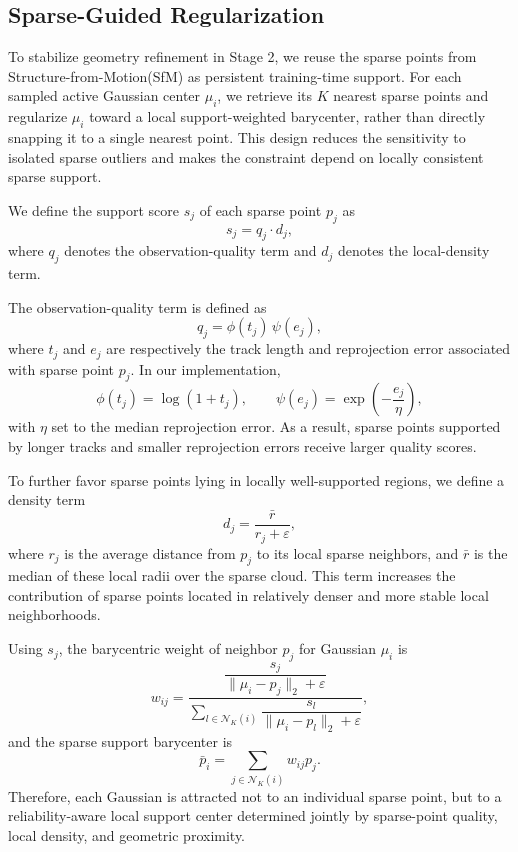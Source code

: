 \subsection{Sparse-Guided Regularization}
To stabilize geometry refinement in Stage 2, we reuse the sparse points from Structure-from-Motion(SfM) as persistent training-time support. For each sampled active Gaussian center $\mu_i$, we retrieve its $K$ nearest sparse points and regularize $\mu_i$ toward a local support-weighted barycenter, rather than directly snapping it to a single nearest point. This design reduces the sensitivity to isolated sparse outliers and makes the constraint depend on locally consistent sparse support.

We define the support score $s_j$ of each sparse point $p_j$ as
\begin{equation}
s_j = q_j \cdot d_j,
\end{equation}
where $q_j$ denotes the observation-quality term and $d_j$ denotes the local-density term.

The observation-quality term is defined as
\begin{equation}
q_j = \phi(t_j)\,\psi(e_j),
\end{equation}
where $t_j$ and $e_j$ are respectively the track length and reprojection error associated with sparse point $p_j$. In our implementation,
\begin{equation}
\phi(t_j)=\log(1+t_j), \qquad
\psi(e_j)=\exp\!\left(-\frac{e_j}{\eta}\right),
\end{equation}
with $\eta$ set to the median reprojection error. As a result, sparse points supported by longer tracks and smaller reprojection errors receive larger quality scores.

To further favor sparse points lying in locally well-supported regions, we define a density term
\begin{equation}
d_j = \frac{\bar{r}}{r_j+\varepsilon},
\end{equation}
where $r_j$ is the average distance from $p_j$ to its local sparse neighbors, and $\bar{r}$ is the median of these local radii over the sparse cloud. This term increases the contribution of sparse points located in relatively denser and more stable local neighborhoods.

Using $s_j$, the barycentric weight of neighbor $p_j$ for Gaussian $\mu_i$ is
\begin{equation}
w_{ij}=
\frac{\dfrac{s_j}{\|\mu_i-p_j\|_2+\varepsilon}}
{\sum\limits_{l\in \mathcal{N}_K(i)}
\dfrac{s_l}{\|\mu_i-p_l\|_2+\varepsilon}},
\end{equation}
and the sparse support barycenter is
\begin{equation}
\bar{p}_i = \sum_{j\in\mathcal{N}_K(i)} w_{ij} p_j .
\end{equation}
Therefore, each Gaussian is attracted not to an individual sparse point, but to a reliability-aware local support center determined jointly by sparse-point quality, local density, and geometric proximity.

